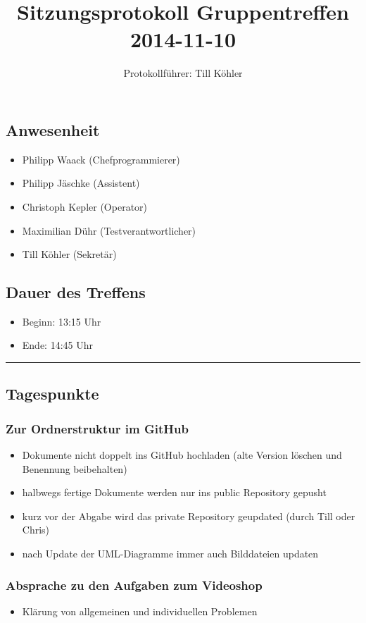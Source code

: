 \documentclass[12pt,a4paper]{article}
\author{Protokollführer: Till Köhler}
\title{Sitzungsprotokoll Gruppentreffen 2014-11-10}
\date{}
\begin{document}
\maketitle

\subsection*{Anwesenheit}
\medskip
\begin{itemize}
\item Philipp Waack (Chefprogrammierer)
\item Philipp Jäschke (Assistent)
\item Christoph Kepler (Operator)
\item Maximilian Dühr (Testverantwortlicher)
\item Till Köhler (Sekretär)
\end{itemize}

\subsection*{Dauer des Treffens}
\medskip
\begin{itemize}
\item Beginn: 13:15 Uhr
\item Ende: 14:45 Uhr
\end{itemize}

\noindent\rule{\textwidth}{1pt}

\subsection*{Tagespunkte}
\medskip

\subsubsection*{Zur Ordnerstruktur im GitHub}
\begin{itemize}
\item Dokumente nicht doppelt ins GitHub hochladen (alte Version löschen und Benennung beibehalten)
\item halbwegs fertige Dokumente werden nur ins public Repository gepusht 
\item kurz vor der Abgabe wird das private Repository geupdated (durch Till oder Chris)
\item nach Update der UML-Diagramme immer auch Bilddateien updaten
\end{itemize}

\subsubsection*{Absprache zu den Aufgaben zum Videoshop}
\begin{itemize}
\item Klärung von allgemeinen und individuellen Problemen
\end{itemize}
\end{document}
